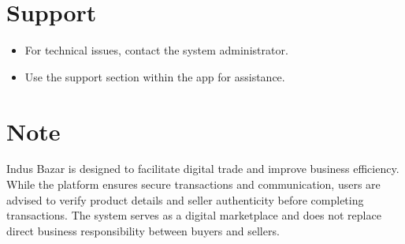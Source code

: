 \section{Support}

\begin{itemize}
    \item For technical issues, contact the system administrator.
    \item Use the support section within the app for assistance.
\end{itemize}

\section{Note}

Indus Bazar is designed to facilitate digital trade and improve business efficiency. While the platform ensures secure transactions and communication, users are advised to verify product details and seller authenticity before completing transactions. The system serves as a digital marketplace and does not replace direct business responsibility between buyers and sellers.